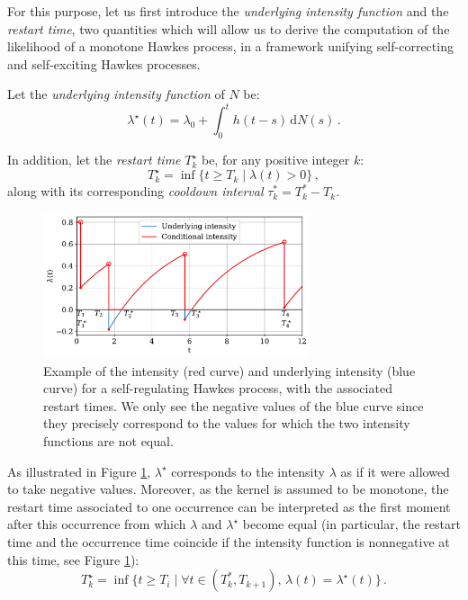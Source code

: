 For this purpose, let us first introduce the \emph{underlying intensity function} and the \emph{restart time}, two quantities which will allow us to
derive the computation of the likelihood of a monotone Hawkes process, in a framework unifying self-correcting and self-exciting Hawkes processes.

\begin{definition}
Let the \emph{underlying intensity function} of $N$ be:
\begin{equation*}
    \lambda^\star(t) = \lambda_0 + \int_{0}^{t}{h(t-s)\,\mathrm{d}N(s)}\,.
\end{equation*}

In addition, let the \emph{restart time} $T_k^\star$ be, for any positive integer $k$:
\begin{equation*}
    T_k^\star = \inf{\{t\geq T_k\mid \lambda(t) > 0\}}\,,
\end{equation*}
along with its corresponding \emph{cooldown interval} $\tau_k^* = T_k^* - T_k$.
\label{def:chap2_underlying}
\end{definition}

\begin{figure}[!ht]
  \centering
  \includegraphics[width=0.7\textwidth]{images/chapter2/cooldownTimesMarkedSerif2.pdf}  %
  \caption{Example of the intensity (red curve) and underlying intensity (blue curve) for a self-regulating Hawkes process, with the associated restart times. We only see the negative values of the blue curve since they precisely correspond to the values for which the two intensity functions are not equal.
  }
  \label{fig:chap2_underlying_intensity}
\end{figure}

As illustrated in Figure \ref{fig:chap2_underlying_intensity}, $\lambda^\star$ corresponds to the intensity $\lambda$ as if it were allowed to take negative values.
Moreover, as the kernel is assumed to be monotone, the restart time associated to one occurrence can be interpreted as the first moment after this occurrence from which $\lambda$ and $\lambda^\star$ become equal  (in particular, the restart time and the occurrence time coincide if the intensity function is nonnegative at this time, see Figure \ref{fig:chap2_underlying_intensity}):
\begin{equation*}
    T_k^\star = \inf{\{t\geq T_i\mid \forall t\in(T_k^*,T_{k+1}),\, \lambda(t) = \lambda^\star(t)\}}\,.
\end{equation*}

